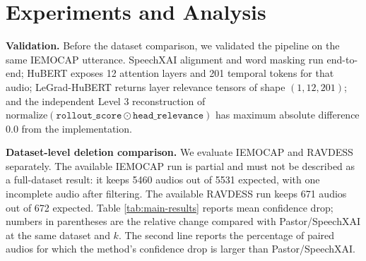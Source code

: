 \documentclass[10pt]{article}
\begin{document}
\section{Experiments and Analysis}

\textbf{Validation.} Before the dataset comparison, we validated the pipeline on the same IEMOCAP utterance. SpeechXAI alignment and word masking run end-to-end; HuBERT exposes 12 attention layers and 201 temporal tokens for that audio; LeGrad-HuBERT returns layer relevance tensors of shape \((1,12,201)\); and the independent Level 3 reconstruction of \(\mathrm{normalize}(\texttt{rollout\_score}\odot\texttt{head\_relevance})\) has maximum absolute difference 0.0 from the implementation.

\textbf{Dataset-level deletion comparison.} We evaluate IEMOCAP and RAVDESS separately. The available IEMOCAP run is partial and must not be described as a full-dataset result: it keeps 5460 audios out of 5531 expected, with one incomplete audio after filtering. The available RAVDESS run keeps 671 audios out of 672 expected. Table \ref{tab:main-results} reports mean confidence drop; numbers in parentheses are the relative change compared with Pastor/SpeechXAI at the same dataset and \(k\). The second line reports the percentage of paired audios for which the method's confidence drop is larger than Pastor/SpeechXAI.
\end{document}
